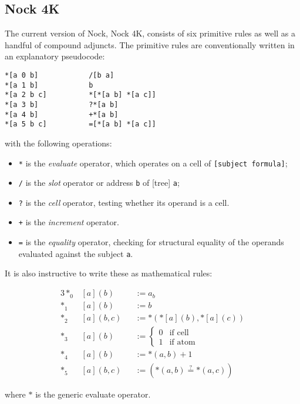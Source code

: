 \subsection{Nock 4K}

The current version of Nock, Nock 4K, consists of six primitive rules as well as a handful of compound adjuncts.  The primitive rules are conventionally written in an explanatory pseudocode:

\begin{lstlisting}[style=nonumbers]
*[a 0 b]            /[b a]
*[a 1 b]            b
*[a 2 b c]          *[*[a b] *[a c]]
*[a 3 b]            ?*[a b]
*[a 4 b]            +*[a b]
*[a 5 b c]          =[*[a b] *[a c]]
\end{lstlisting}

with the following operations:

\begin{itemize}
  \item  \texttt{*} is the \emph{evaluate} operator, which operates on a cell of \texttt{[subject formula]};
  \item  \texttt{/} is the \emph{slot} operator or address \texttt{b} of [tree] \texttt{a};
  \item  \texttt{?} is the \emph{cell} operator, testing whether its operand is a cell.
  \item  \texttt{+} is the \emph{increment} operator.
  \item  \texttt{=} is the \emph{equality} operator, checking for structural equality of the operands evaluated against the subject \texttt{a}.
\end{itemize}

It is also instructive to write these as mathematical rules:

\begin{alignat*}{3}
*_{0}&[a](b) &&:= a_{b} \\
*_{1}&[a](b) &&:= b \\
*_{2}&[a](b,c) &&:= *({*[a](b)}, {*[a](c)}) \\
*_{3}&[a](b) &&:= \left\{\begin{matrix} 0 & \text{if cell} \\ 1 & \text{if atom} \end{matrix} \right. \\
*_{4}&[a](b) &&:= {*(a,b) + 1} \\
*_{5}&[a](b,c) &&:= ({*(a,b)} \stackrel{?}{=} {*(a,c)})
\end{alignat*}

where $*$ is the generic evaluate operator.

